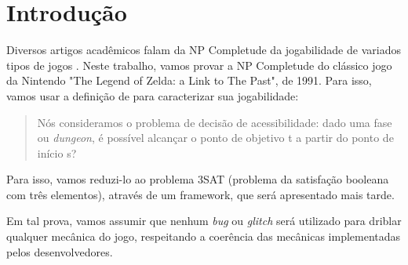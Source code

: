 \section{Introdução}

Diversos artigos acadêmicos falam da NP Completude da jogabilidade
de variados tipos de jogos \cite{cormodehardness} \cite{forivsek2010computational}
\cite{viglietta2014gaming}. Neste trabalho, vamos provar a NP Completude do clássico jogo 
da Nintendo "The Legend of Zelda: a Link to The Past", de 1991. Para isso, vamos usar a definição de \cite{aloupis2015classic}
para caracterizar sua jogabilidade: 

\begin{quote}
    Nós consideramos o problema de decisão de acessibilidade: dado uma fase ou \textit{dungeon}, é possível
    alcançar o ponto de objetivo t a partir do ponto de início s?
\end{quote}

Para isso, vamos reduzi-lo ao problema 3SAT (problema da satisfação booleana com três elementos), através de um framework, que será apresentado mais tarde.

Em tal prova, vamos assumir que nenhum \textit{bug} ou \textit{glitch} será utilizado para driblar
qualquer mecânica do jogo, respeitando a coerência das mecânicas implementadas pelos desenvolvedores.